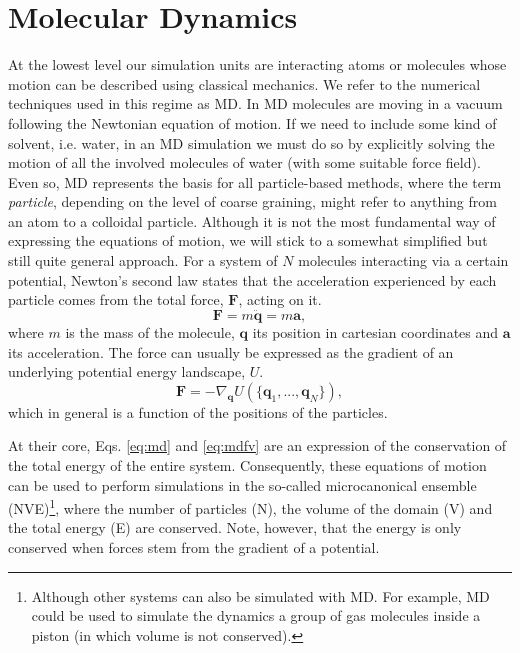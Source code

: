 \documentclass[ twoside,openright,titlepage,numbers=noenddot,%
headinclude,footinclude,cleardoublepage=empty,abstract=on,
BCOR=5mm,paper=b5,fontsize=11pt, dvipsnames
]{scrreprt}
\renewcommand{\vec}[1]{\bm{#1}}
\newcommand{\ppos}{q}
\begin{document}
\chapter{Molecular Dynamics}\label{sec:md}

At the lowest level our simulation units are interacting atoms or molecules whose motion can be described using classical mechanics. We refer to the numerical techniques used in this regime as \gls{MD}.
In \gls{MD} molecules are moving in a vacuum following the Newtonian equation of motion. If we need to include some kind of solvent, i.e. water, in an \gls{MD} simulation we must do so by explicitly solving the motion of all the involved molecules of water (with some suitable force field).
Even so, \gls{MD} represents the basis for all particle-based methods, where the term \emph{particle}, depending on the level of coarse graining, might refer to anything from an atom to a colloidal particle.
Although it is not the most fundamental way of expressing the equations of motion, we will stick to a somewhat simplified but still quite general approach. For a system of $N$ molecules interacting via a certain potential, Newton's second law states that the acceleration experienced by each particle comes from the total force, $\vec{F}$, acting on it.
\begin{equation}
  \label{eq:md}
  \vec{F} =  m\ddot{\vec{\ppos}} = m\vec{a},
\end{equation}
where $m$ is the mass of the molecule, $\vec{\ppos}$ its position in cartesian coordinates and $\vec{a}$ its acceleration.
The force can usually be expressed as the gradient of an underlying potential energy landscape, $U$.
\begin{equation}
  \label{eq:mdfv}
  \vec{F} = -\nabla_{\vec{\ppos}} U(\{\vec{\ppos}_1,...,\vec{\ppos}_N\}),
\end{equation}
which in general is a function of the positions of the particles.


At their core, Eqs. \eqref{eq:md} and \eqref{eq:mdfv} are an expression of the conservation of the total energy of the entire system. Consequently, these equations of motion can be used to perform simulations in the so-called microcanonical ensemble (NVE)\footnote{Although other systems can also be simulated with \gls{MD}. For example, \gls{MD} could be used to simulate the dynamics a group of gas molecules inside a piston (in which volume is not conserved).}, where the number of particles (N), the volume of the domain (V) and the total energy (E) are conserved. Note, however, that the energy is only conserved when forces stem from the gradient of a potential.
\end{document}
